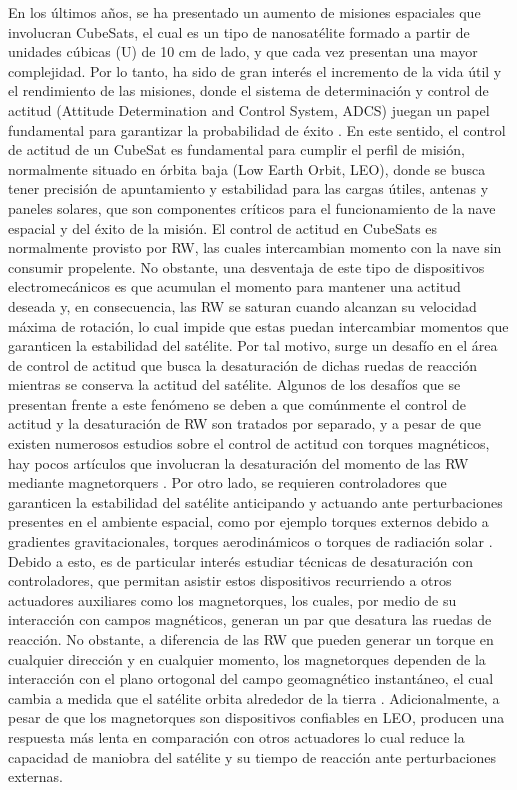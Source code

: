 En los últimos años, se ha presentado un aumento de misiones espaciales que involucran CubeSats, el cual es un tipo de nanosatélite formado a partir de unidades cúbicas (U) de 10 cm de lado, y que cada vez presentan una mayor complejidad. Por lo tanto, ha sido de gran interés el incremento de la vida útil y el rendimiento de las misiones, donde el sistema de determinación y control de actitud (Attitude Determination and Control System, ADCS)  juegan un papel fundamental para garantizar la probabilidad de éxito \cite{Venturini2018}. En este sentido, el control de actitud de un CubeSat es fundamental para cumplir el perfil de misión, normalmente situado en órbita baja (Low Earth Orbit, LEO),  donde se busca tener precisión de apuntamiento y estabilidad para las cargas útiles, antenas y paneles solares, que son componentes críticos para el funcionamiento de la nave espacial y del éxito de la misión.
El control de actitud en CubeSats es normalmente provisto por RW, las cuales intercambian momento con la nave sin consumir propelente. No obstante, una desventaja de este tipo de dispositivos electromecánicos es que acumulan el momento para mantener una actitud deseada y, en consecuencia, las RW se saturan cuando alcanzan su velocidad máxima de rotación, lo cual impide que estas puedan intercambiar momentos que garanticen la estabilidad del satélite. Por tal motivo, surge un desafío en el área de control de actitud que busca la desaturación de dichas ruedas de reacción mientras se conserva la actitud del satélite.
Algunos de los desafíos que se presentan frente a este fenómeno se deben a que comúnmente el control de actitud y la desaturación de RW son tratados por separado, y a pesar de que existen numerosos estudios sobre el control de actitud con torques magnéticos, hay pocos artículos que involucran la desaturación del momento de las RW mediante magnetorquers \cite{Yang2017}. Por otro lado, se requieren controladores que garanticen la estabilidad del satélite anticipando y actuando ante perturbaciones presentes en el ambiente espacial, como por ejemplo torques externos debido a gradientes gravitacionales, torques aerodinámicos o torques de radiación solar \cite{Kaplan1976}.
Debido a esto, es de particular interés estudiar técnicas de desaturación con controladores, que permitan asistir estos dispositivos recurriendo a otros actuadores auxiliares como los magnetorques, los cuales, por medio de su interacción con campos magnéticos, generan un par que desatura las ruedas de reacción. No obstante, a diferencia de las RW que pueden generar un torque en cualquier dirección y en cualquier momento, los magnetorques dependen de la interacción con el plano ortogonal del campo geomagnético instantáneo, el cual cambia a medida que el satélite orbita alrededor de la tierra \cite{Tregouet2015}. Adicionalmente, a pesar de que los magnetorques son dispositivos confiables en LEO, producen una respuesta más lenta en comparación con otros actuadores lo cual reduce la capacidad de maniobra del satélite y su tiempo de reacción ante perturbaciones externas.
